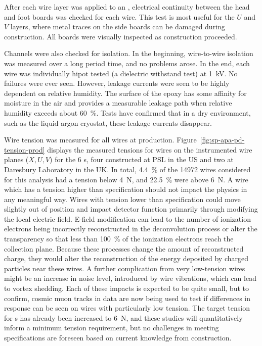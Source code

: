 After each wire layer was applied to an , electrical continuity between the head and foot boards was checked for each wire.  This test is most useful for the $U$ and $V$ layers, where metal traces on the side boards can be damaged during construction. All boards were visually inspected as construction proceeded.

Channels were also checked for isolation.  In the beginning, wire-to-wire isolation was measured over a long period time, and no problems arose.  In the end, each wire was individually hipot tested (a dielectric withstand test) at \SI{1}{kV}. No failures were ever seen. However, leakage currents were seen to be highly dependent on relative humidity.  The surface of the epoxy has some affinity for moisture in the air and provides a measurable leakage path when relative humidity exceeds about \SI{60}{\%}. Tests have confirmed that in a dry environment, such as the liquid argon cryostat, these leakage currents disappear.

Wire tension was measured for all wires at production.  Figure~\ref{fig:sp-apa-pd-tension-prod} displays the measured tensions for wires on the instrumented wire planes ($X, U, V$) for the 6  s, four constructed at PSL in the US and two at Daresbury Laboratory in the UK.  %
In total, \SI{4.4}{\%} of the \num{14972} wires considered for this analysis had a tension below \SI{4}{N}, and \SI{22.5}{\%} were above \SI{6}{N}. 
A wire which has a tension higher than specification should not impact the physics in any meaningful way. Wires with tension lower than specification could move slightly out of position and impact detector function primarily through modifying the local electric field. E-field modification can lead to the number of ionization electrons being incorrectly reconstructed in the deconvolution process or alter the transparency so that less than \SI{100}{\%} of the ionization electrons reach the collection plane. Because these processes change the amount of reconstructed charge, they would alter the reconstruction of the energy deposited by charged particles near these wires. A further complication from very low-tension wires might be an increase in noise level, introduced by wire vibrations, which can lead to vortex shedding.  Each of these impacts is expected to be quite small, but to confirm, cosmic muon tracks in  data are now being used to test if differences in response can be seen on wires with particularly low tension.  The target tension for  s has already been increased to \SI{6}{N}, and these  studies will quantitatively inform a minimum tension requirement, but no challenges in meeting specifications are foreseen based on current knowledge from  construction.   



